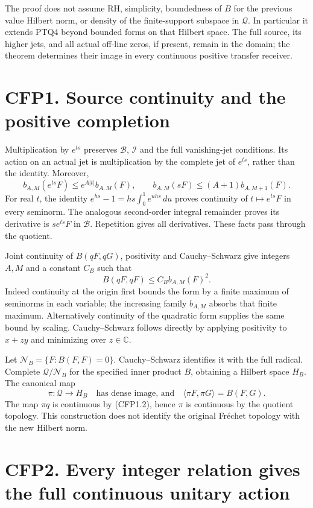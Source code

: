 The proof does not assume RH, simplicity, boundedness of \(B\) for the
previous value Hilbert norm, or density of the finite-support subspace
in \(\mathcal Q\). In particular it extends PTQ4 beyond bounded forms on
that Hilbert space. The full source, its higher jets, and all actual
off-line zeros, if present, remain in the domain; the theorem determines
their image in every continuous positive transfer receiver.

\section{CFP1. Source continuity and the positive
completion}\label{cfp1.-source-continuity-and-the-positive-completion}

Multiplication by \(e^{ts}\) preserves \(\mathcal B\), \(\mathcal I\)
and the full vanishing-jet conditions. Its action on an actual jet is
multiplication by the complete jet of \(e^{ts}\), rather than the
identity. Moreover, \[
b_{A,M}(e^{ts}F)\le e^{A|t|}b_{A,M}(F),\qquad
b_{A,M}(sF)\le(A+1)b_{A,M+1}(F).
\tag{CFP1.1}
\] For real \(t\), the identity \(e^{hs}-1=hs\int_0^1e^{uhs}\,du\)
proves continuity of \(t\mapsto e^{ts}F\) in every seminorm. The
analogous second-order integral remainder proves its derivative is
\(se^{ts}F\) in \(\mathcal B\). Repetition gives all derivatives. These
facts pass through the quotient.

Joint continuity of \(B(qF,qG)\), positivity and Cauchy--Schwarz give
integers \(A,M\) and a constant \(C_B\) such that \[
B(qF,qF)\le C_B b_{A,M}(F)^2.
\tag{CFP1.2}
\] Indeed continuity at the origin first bounds the form by a finite
maximum of seminorms in each variable; the increasing family \(b_{A,M}\)
absorbs that finite maximum. Alternatively continuity of the quadratic
form supplies the same bound by scaling. Cauchy--Schwarz follows
directly by applying positivity to \(x+zy\) and minimizing over
\(z\in\mathbb C\).

Let \(\mathcal N_B=\{F:B(F,F)=0\}\). Cauchy--Schwarz identifies it with
the full radical. Complete \(\mathcal Q/\mathcal N_B\) for the specified
inner product \(B\), obtaining a Hilbert space \(H_B\). The canonical
map \[
\pi:\mathcal Q\longrightarrow H_B
\quad\text{has dense image, and}\quad
\langle\pi F,\pi G\rangle=B(F,G).
\tag{CFP1.3}
\] The map \(\pi q\) is continuous by (CFP1.2), hence \(\pi\) is
continuous by the quotient topology. This construction does not identify
the original Fréchet topology with the new Hilbert norm.

\section{CFP2. Every integer relation gives the full continuous unitary
action}\label{cfp2.-every-integer-relation-gives-the-full-continuous-unitary-action}

